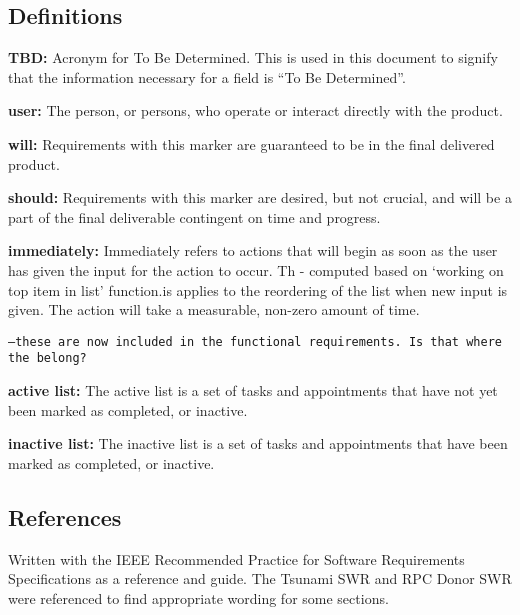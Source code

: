 \documentclass[12pt,a4paper]{article}
\begin{document}
\subsection{Definitions}
\begin{enumerate}
\item \textbf{TBD:} Acronym for To Be Determined. This is used in this document to signify that the information necessary for a field is ``To Be Determined''.
\item \textbf{user:} The person, or persons, who operate or interact directly with the product.
\item \textbf{will:} Requirements with this marker are guaranteed to be in the final delivered product.
\item \textbf{should:} Requirements with this marker are desired, but not crucial, and will
be a part of the final deliverable contingent on time and progress.
\item \textbf{immediately:} Immediately refers to actions that will begin as soon as the user has given the input for the action to occur.  Th - computed based on `working on top item in list' function.is applies to the reordering of the list when new input is given.  The action will take a measurable, non-zero amount of time.

{\tt --these are now included in the functional requirements. Is that where the belong?
\item \textbf{active list:} The active list is a set of tasks and appointments that have not yet been marked as completed, or inactive.
\item \textbf{inactive list:} The inactive list is a set of tasks and appointments that have been marked as completed, or inactive.}

\end{enumerate}

\subsection{References}
Written with the IEEE Recommended Practice for Software Requirements Specifications as a reference and guide. The Tsunami SWR and RPC Donor SWR were referenced to find appropriate wording for some sections.
\end{document}

